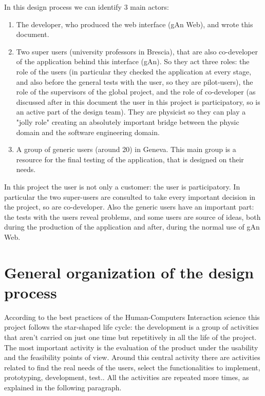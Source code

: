 In this design process we can identify 3 main actors: 
\begin{enumerate}

\item
The developer, who produced the web interface (gAn Web), and wrote this document.

\item 
Two super users (university professors in Brescia), that are also co-developer of the application behind this interface (gAn). So they act three roles: the role of the users (in particular they checked the application at every stage, and also before the general tests with the user, so they are pilot-users), the role of the supervisors of the global project, and the role of co-developer (as discussed after in this document the user in this project is participatory, so is an active part of the design team). 
They are physicist so they can play a "jolly role" creating an absolutely important bridge between the physic domain and the software engineering domain. 

\item A group of generic users (around 20) in Geneva. This main group is a resource for the final testing of the application, that is designed on their needs.
 
\end{enumerate}

In this project the user is not only a customer: the user is participatory. In particular the two super-users are consulted to take every important decision in the project, so are co-developer. Also the generic users have an important part: the tests with the users reveal problems, and some users are source of ideas, both during the production of the application and after, during the normal use of gAn Web.

\section{General organization of the design process }
According to the best practices of the Human-Computers Interaction science this project follows the star-shaped life cycle: the development is a group of activities that aren't carried on just one time but repetitively in all the life of the project. The most important activity is the evaluation of the product under the usability and the feasibility points of view. Around this central activity there are activities related to find the real needs of the users, select the functionalities to implement, prototyping, development, test.. All the activities are repeated more times, as explained in the following paragraph.    

